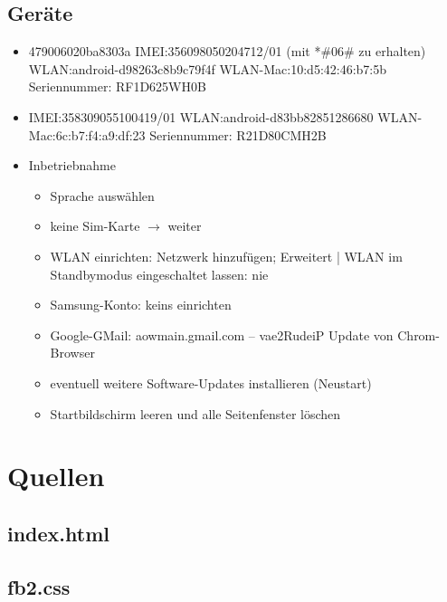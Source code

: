 \documentclass[a4paper]{scrartcl}
\begin{document}
		\subsection{Geräte}
			\begin{itemize}
				\item 479006020ba8303a \newline
					IMEI:356098050204712/01 (mit *\#06\# zu erhalten) \newline
					WLAN:android-d98263c8b9c79f4f \newline
					WLAN-Mac:10:d5:42:46:b7:5b \newline
					Seriennummer: RF1D625WH0B
				\item  
					IMEI:358309055100419/01 \newline
					WLAN:android-d83bb82851286680 \newline
					WLAN-Mac:6c:b7:f4:a9:df:23 \newline
					Seriennummer: R21D80CMH2B
				\item Inbetriebnahme
					\begin{itemize}
						\item Sprache auswählen
						\item keine Sim-Karte $\rightarrow$ weiter
						\item WLAN einrichten: Netzwerk hinzufügen; Erweitert | WLAN im Standbymodus eingeschaltet lassen: nie
						\item Samsung-Konto: keins einrichten
						\item Google-GMail: aowmain.gmail.com -- vae2RudeiP\newline
							Update von Chrom-Browser
						\item eventuell weitere Software-Updates installieren (Neustart)
						\item Startbildschirm leeren und alle Seitenfenster löschen

					\end{itemize}
			\end{itemize}
		\section{Quellen}
			\subsection{index.html}
				
			\subsection{fb2.css}
				
\end{document}
